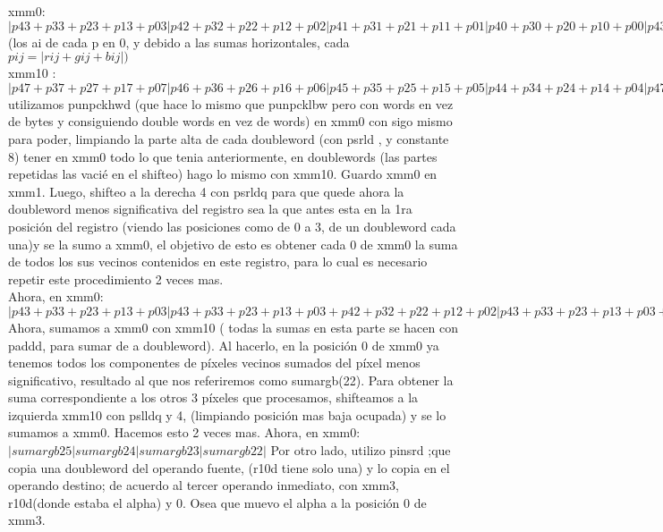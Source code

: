 \documentclass[a4paper]{article}
\begin{document}
 xmm0: $|p43+p33+p23+p13+p03|p42+p32+p22+p12+p02|p41+p31+p21+p11+p01|p40+p30+p20+p10+p00|p43+p33+p23+p13+p03|p42+p32+p22+p12+p02|p41+p31+p21+p11+p01|p40+p30+p20+p10+p00|$ (los ai de cada p en 0, y debido a las sumas horizontales, cada $pij =  |rij+gij+bij|)$
 \hfill \break \\
 xmm10 :$|p47+p37+p27+p17+p07|p46+p36+p26+p16+p06|p45+p35+p25+p15+p05|p44+p34+p24+p14+p04|p47+p37+p27+p17+p07|p46+p36+p26+p16+p06|p45+p35+p25+p15+p05|p44+p34+p24+p14+p04|$
 \hfill \break  \\
 utilizamos punpckhwd (que hace lo mismo que punpcklbw pero con words en vez de bytes y consiguiendo double words en vez de words) en xmm0 con sigo mismo para poder, limpiando la parte alta de cada doubleword (con psrld , y constante 8) tener en xmm0 todo lo que tenia anteriormente,  en doublewords (las partes repetidas las vacié en el shifteo) hago lo mismo con xmm10.
 \hfill \break
 Guardo xmm0 en xmm1. Luego, shifteo a la derecha 4 con psrldq para que quede ahora la doubleword menos significativa del registro sea la que antes esta en la 1ra posición del registro (viendo las posiciones como  de 0 a 3, de un doubleword cada una)y se la sumo a xmm0, el objetivo de esto es obtener cada  0 de xmm0  la suma de todos los sus vecinos contenidos en este registro, para lo cual es necesario repetir este procedimiento  2 veces mas.
 \hfill \break
 \\
Ahora, en xmm0:$|p43+p33+p23+p13+p03|p43+p33+p23+p13+p03+p42+p32+p22+p12+p02|p43+p33+p23+p13+p03+p42+p32+p22+p12+p02+p41+p31+p21+p11+p01|p43+p33+p23+p13+p03+p42+p32+p22+p12+p02+p41+p31+p21+p11+p01+p40+p30+p20+p10+p00|$
\\
\hfill \break
Ahora, sumamos a xmm0 con xmm10 ( todas la sumas en esta parte se hacen con paddd, para sumar de a doubleword). Al hacerlo, en la posición 0 de xmm0 ya tenemos todos los componentes de píxeles vecinos sumados del píxel menos significativo, resultado al que nos referiremos como sumargb(22).
\hfill \break
 Para obtener la suma correspondiente a los otros 3 píxeles que procesamos,  shifteamos a la izquierda xmm10 con pslldq y 4, (limpiando posición mas baja ocupada) y se lo sumamos a xmm0. Hacemos esto 2 veces mas.
 \hfill \break
Ahora, en xmm0:$ |sumargb25|sumargb24|sumargb23|sumargb22|$
\hfill \break
Por otro lado, utilizo pinsrd ;que copia una doubleword del operando fuente, (r10d tiene solo una) y lo copia en el operando destino; de acuerdo al tercer operando inmediato,   con xmm3, r10d(donde estaba el alpha) y 0. Osea que muevo el alpha  a la posición 0 de xmm3.
\hfill \break
\end{document}
